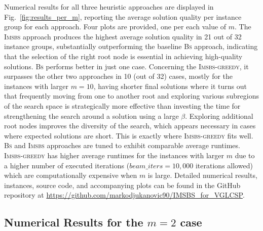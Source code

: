 \documentclass[runningheads]{llncs}
\begin{document}
	
	Numerical results for all three heuristic approaches are displayed in Fig.~\ref{fig:results_per_m}, reporting the average solution quality per instance group for each approach. Four plots are provided, one per each value of $m$. %
	The \textsc{Imsbs} approach produces the highest average solution quality in 21 out of 32 instance groups, substantially outperforming the baseline \textsc{Bs} approach, indicating that the selection of the right root node is essential in achieving high-quality solutions.   \textsc{Bs} performs better in just one case. Concerning the \textsc{Imsbs-greedy}, it surpasses the other two approaches in 10 (out of 32) cases, mostly for the instances with larger $m=10$, having shorter final solutions where it turns out that frequently moving from one to another root and exploring various subregions of the search space is strategically more effective than investing the time for strengthening the search around a solution using a large $\beta$.  Exploring additional root nodes improves the diversity of the search, which appears necessary in cases where expected solutions are short. This is exactly where  \textsc{Imsbs-greedy} fits well. 
	\textsc{Bs} and \textsc{Imsbs} approaches are tuned to exhibit comparable average runtimes.  \textsc{Imsbs-greedy} has higher average runtimes for the instances with larger $m$ due to a higher number of executed iterations ($beam\_iters = 10,000$ iterations allowed) which are computationally expensive when $m$ is large. Detailed numerical results, instances, source code, and  accompanying plots can be found in the GitHub repository at \url{https://github.com/markodjukanovic90/IMSBS_for_VGLCSP}.  %
	
	\subsection{Numerical Results for the $m=2$ case}
	
\end{document}
